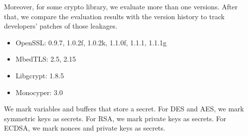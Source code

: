 Moreover, for some crypto library, we evaluate more than one versions. After that, we compare the evaluation results with the version history to track developers' patches of those leakages.  
\begin{itemize}
\item OpenSSL: 0.9.7, 1.0.2f, 1.0.2k, 1.1.0f, 1.1.1, 1.1.1g
\item MbedTLS: 2.5, 2.15
\item Libgcrypt: 1.8.5
\item Monocyper: 3.0
\end{itemize}

We mark variables and buffers that store a secret.
For DES and AES, we mark symmetric keys as secrets. 
For RSA, we mark private keys as secrets. For ECDSA, 
we mark nonces and private keys as secrets.  


